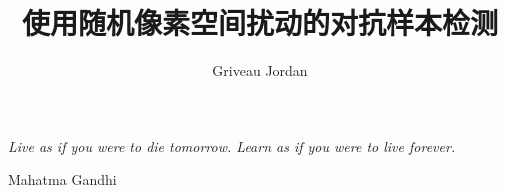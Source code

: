 \documentclass{hnuthesis}
\title{使用随机像素空间扰动的对抗样本检测}
\author{Griveau Jordan}
\newcommand\blankpage{%
    \null
    \thispagestyle{empty}%
    \addtocounter{page}{-1}%
    \newpage}
\begin{document}
\maketitle


\vspace*{0.2\textheight}

{\itshape Live as if you were to die tomorrow. Learn as if you
    were to live forever.}\bigbreak

\hfill Mahatma Gandhi
\afterpage{\blankpage}


\tableofcontents
\listoffigures
\listoftables

\mainmatter








\backmatter

\end{document}
